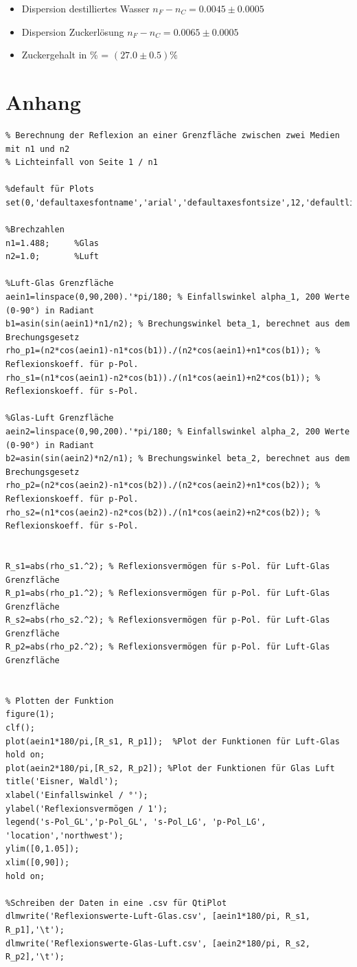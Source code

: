 \documentclass[12pt,a4paper,twoside]{article}
\begin{document}
\begin{itemize}
    \item Dispersion destilliertes Wasser $n_F-n_C = 0.0045 \pm 0.0005$
    \item Dispersion Zuckerlösung $n_F-n_C = 0.0065 \pm 0.0005$
    \item Zuckergehalt in \% = $(27.0 \pm 0.5) \%$
\end{itemize}



\section{Anhang}

\begin{verbatim}
% Berechnung der Reflexion an einer Grenzfläche zwischen zwei Medien mit n1 und n2
% Lichteinfall von Seite 1 / n1

%default für Plots
set(0,'defaultaxesfontname','arial','defaultaxesfontsize',12,'defaultlinelinewidth',2);

%Brechzahlen
n1=1.488;     %Glas
n2=1.0;       %Luft             

%Luft-Glas Grenzfläche
aein1=linspace(0,90,200).'*pi/180; % Einfallswinkel alpha_1, 200 Werte (0-90°) in Radiant
b1=asin(sin(aein1)*n1/n2); % Brechungswinkel beta_1, berechnet aus dem Brechungsgesetz
rho_p1=(n2*cos(aein1)-n1*cos(b1))./(n2*cos(aein1)+n1*cos(b1)); % Reflexionskoeff. für p-Pol.
rho_s1=(n1*cos(aein1)-n2*cos(b1))./(n1*cos(aein1)+n2*cos(b1)); % Reflexionskoeff. für s-Pol.

%Glas-Luft Grenzfläche
aein2=linspace(0,90,200).'*pi/180; % Einfallswinkel alpha_2, 200 Werte (0-90°) in Radiant
b2=asin(sin(aein2)*n2/n1); % Brechungswinkel beta_2, berechnet aus dem Brechungsgesetz
rho_p2=(n2*cos(aein2)-n1*cos(b2))./(n2*cos(aein2)+n1*cos(b2)); % Reflexionskoeff. für p-Pol.
rho_s2=(n1*cos(aein2)-n2*cos(b2))./(n1*cos(aein2)+n2*cos(b2)); % Reflexionskoeff. für s-Pol.


R_s1=abs(rho_s1.^2); % Reflexionsvermögen für s-Pol. für Luft-Glas Grenzfläche
R_p1=abs(rho_p1.^2); % Reflexionsvermögen für p-Pol. für Luft-Glas Grenzfläche
R_s2=abs(rho_s2.^2); % Reflexionsvermögen für p-Pol. für Luft-Glas Grenzfläche
R_p2=abs(rho_p2.^2); % Reflexionsvermögen für p-Pol. für Luft-Glas Grenzfläche


% Plotten der Funktion
figure(1);
clf();
plot(aein1*180/pi,[R_s1, R_p1]);  %Plot der Funktionen für Luft-Glas
hold on;
plot(aein2*180/pi,[R_s2, R_p2]); %Plot der Funktionen für Glas Luft
title('Eisner, Waldl');
xlabel('Einfallswinkel / °');
ylabel('Reflexionsvermögen / 1');
legend('s-Pol_GL','p-Pol_GL', 's-Pol_LG', 'p-Pol_LG', 'location','northwest');
ylim([0,1.05]);
xlim([0,90]);
hold on;

%Schreiben der Daten in eine .csv für QtiPlot
dlmwrite('Reflexionswerte-Luft-Glas.csv', [aein1*180/pi, R_s1, R_p1],'\t');
dlmwrite('Reflexionswerte-Glas-Luft.csv', [aein2*180/pi, R_s2, R_p2],'\t');
\end{verbatim}

\printbibliography[heading=bibintoc]
\end{document}

